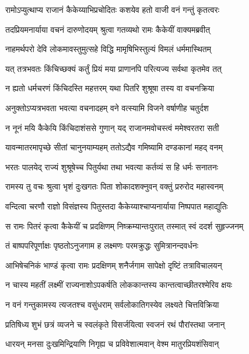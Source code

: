 \twolineshloka
{रामोऽप्युत्थाप्य राजानं कैकेय्याभिप्रचोदितः}
{कशयेव हतो वाजी वनं गन्तुं कृतत्वरः} %

\twolineshloka
{तदप्रियमनार्याया वचनं दारुणोदयम्}
{श्रुत्वा गतव्यथो रामः कैकेयीं वाक्यमब्रवीत्} %

\twolineshloka
{नाहमर्थपरो देवि लोकमावस्तुमुत्सहे}
{विद्धि मामृषिभिस्तुल्यं विमलं धर्ममास्थितम्} %

\twolineshloka
{यत् तत्रभवतः किंचिच्छक्यं कर्तुं प्रियं मया}
{प्राणानपि परित्यज्य सर्वथा कृतमेव तत्} %

\twolineshloka
{न ह्यतो धर्मचरणं किंचिदस्ति महत्तरम्}
{यथा पितरि शुश्रूषा तस्य वा वचनक्रिया} %

\twolineshloka
{अनुक्तोऽप्यत्रभवता भवत्या वचनादहम्}
{वने वत्स्यामि विजने वर्षाणीह चतुर्दश} %

\twolineshloka
{न नूनं मयि कैकेयि किंचिदाशंससे गुणान्}
{यद् राजानमवोचस्त्वं ममेश्वरतरा सती} %

\twolineshloka
{यावन्मातरमापृच्छे सीतां चानुनयाम्यहम्}
{ततोऽद्यैव गमिष्यामि दण्डकानां महद् वनम्} %

\twolineshloka
{भरतः पालयेद् राज्यं शुश्रूषेच्च पितुर्यथा}
{तथा भवत्या कर्तव्यं स हि धर्मः सनातनः} %

\twolineshloka
{रामस्य तु वचः श्रुत्वा भृशं दुःखगतः पिता}
{शोकादशक्नुवन् वक्तुं प्ररुरोद महास्वनम्} %

\twolineshloka
{वन्दित्वा चरणौ राज्ञो विसंज्ञस्य पितुस्तदा}
{कैकेय्याश्चाप्यनार्याया निष्पपात महाद्युतिः} %

\twolineshloka
{स रामः पितरं कृत्वा कैकेयीं च प्रदक्षिणम्}
{निष्क्रम्यान्तःपुरात् तस्मात् स्वं ददर्श सुहृज्जनम्} %

\twolineshloka
{तं बाष्पपरिपूर्णाक्षः पृष्ठतोऽनुजगाम ह}
{लक्ष्मणः परमक्रुद्धः सुमित्रानन्दवर्धनः} %

\twolineshloka
{आभिषेचनिकं भाण्डं कृत्वा रामः प्रदक्षिणम्}
{शनैर्जगाम सापेक्षो दृष्टिं तत्राविचालयन्} %

\twolineshloka
{न चास्य महतीं लक्ष्मीं राज्यनाशोऽपकर्षति}
{लोककान्तस्य कान्तत्वाच्छीतरश्मेरिव क्षयः} %

\twolineshloka
{न वनं गन्तुकामस्य त्यजतश्च वसुंधराम्}
{सर्वलोकातिगस्येव लक्ष्यते चित्तविक्रिया} %

\twolineshloka
{प्रतिषिध्य शुभं छत्रं व्यजने च स्वलंकृते}
{विसर्जयित्वा स्वजनं रथं पौरांस्तथा जनान्} %

\twolineshloka
{धारयन् मनसा दुःखमिन्द्रियाणि निगृह्य च}
{प्रविवेशात्मवान् वेश्म मातुरप्रियशंसिवान्} %

